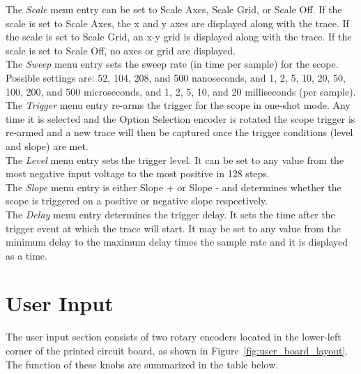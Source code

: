 \documentclass{scrartcl}
\begin{document}
The \textit{Scale} menu entry can be set to Scale Axes, Scale Grid, or Scale Off. If the scale is set to Scale Axes, the x and y axes are displayed along with the trace. If the scale is set to Scale Grid, an x-y grid is displayed along with the trace. If the scale is set to Scale Off, no axes or grid are displayed.\\

The \textit{Sweep} menu entry sets the sweep rate (in time per sample) for the scope. Possible settings are: 52, 104, 208, and 500 nanoseconds, and 1, 2, 5, 10, 20, 50, 100, 200, and 500 microseconds, and 1, 2, 5, 10, and 20 milliseconds (per sample).\\

The \textit{Trigger} menu entry re-arms the trigger for the scope in one-shot mode. Any time it is selected and the Option Selection encoder is rotated the scope trigger is re-armed and a new trace will then be captured once the trigger conditions (level and slope) are met.\\

The \textit{Level} menu entry sets the trigger level. It can be set to any value from the most negative input voltage to the most positive in 128 steps.\\

The \textit{Slope} menu entry is either Slope + or Slope - and determines whether the scope is triggered on a positive or negative slope respectively.\\

The \textit{Delay} menu entry determines the trigger delay. It sets the time after the trigger event at which the trace will start. It may be set to any value from the minimum delay to the maximum delay times the sample rate and it is displayed as a time.\\

	\section{User Input}
	The user input section consists of two rotary encoders located in the lower-left corner of the printed circuit board, as shown in Figure~\ref{fig:user_board_layout}. The function of these knobs are summarized in the table below.
\end{document}
